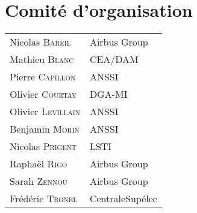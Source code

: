 \section*{Comit\'e d'organisation}
\begin{tabular}{@{}p{5cm}@{}p{6.5cm}@{}}
  Nicolas  \textsc{Bareil}        & Airbus Group        \\
  Mathieu  \textsc{Blanc}         & CEA/DAM             \\
  Pierre   \textsc{Capillon}      & ANSSI               \\
  Olivier  \textsc{Courtay}       & DGA-MI              \\
  Olivier  \textsc{Levillain}     & ANSSI               \\
  Benjamin \textsc{Morin}         & ANSSI               \\
  Nicolas  \textsc{Prigent}       & LSTI                \\
  Raphaël  \textsc{Rigo}          & Airbus Group        \\
  Sarah  \textsc{Zennou}          & Airbus Group        \\
  Frédéric  \textsc{Tronel}   & CentraleSupélec         \\
\end{tabular}

